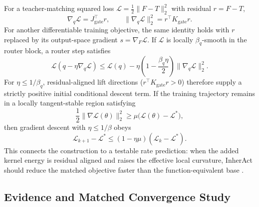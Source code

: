 \documentclass{article}
\begin{document}
For a teacher-matching squared loss
$\mathcal{L}=\tfrac12\|F-T\|_2^2$ with residual $r=F-T$,
\begin{equation}
  \nabla_q\mathcal{L}=J_{\mathrm{gate}}^\top r,\qquad
  \|\nabla_q\mathcal{L}\|_2^2=r^\top K_{\mathrm{gate}}r.
  \label{eq:router-parameter-gradient}
\end{equation}
For another differentiable training objective, the same identity holds with
$r$ replaced by its output-space gradient $s=\nabla_F\mathcal{L}$.
If $\mathcal{L}$ is locally $\beta_q$-smooth in the router block, a router step
satisfies
\begin{equation}
  \mathcal{L}(q-\eta\nabla_q\mathcal{L})
  \leq\mathcal{L}(q)
  -\eta\left(1-\frac{\beta_q\eta}{2}\right)
  \|\nabla_q\mathcal{L}\|_2^2.
  \label{eq:conditional-descent}
\end{equation}
For $\eta\leq1/\beta_q$, residual-aligned lift directions
($r^\top K_{\mathrm{gate}}r>0$) therefore supply a strictly positive initial
conditional descent term.  If the training trajectory remains in a locally
tangent-stable region satisfying
\begin{equation}
  \frac12\|\nabla\mathcal{L}(\theta)\|_2^2
  \geq\mu\big(\mathcal{L}(\theta)-\mathcal{L}^*\big),
\end{equation}
then gradient descent with $\eta\leq1/\beta$ obeys
\begin{equation}
  \mathcal{L}_{k+1}-\mathcal{L}^*
  \leq(1-\eta\mu)(\mathcal{L}_k-\mathcal{L}^*).
\end{equation}
This connects the construction to a testable rate prediction: when the added
kernel energy is residual aligned and raises the effective local curvature,
InherAct should reduce the matched objective faster than the function-equivalent
base \cite{jacot2018ntk,karimi2016pl}.

\subsection{Evidence and Matched Convergence Study}
\end{document}

